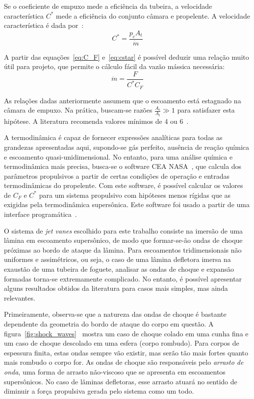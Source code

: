 Se o coeficiente de empuxo mede a eficiência da tubeira, a velocidade característica \(C^*\) mede a eficiência do conjunto câmara e propelente. A velocidade característica é dada por~\cite{Sutton}:
\begin{equation}
    \label{eq:cstar}
    C^* = \frac{p_c A_t}{\dot{m}}
\end{equation}

A partir das equações~\ref{eq:C_F} e~\ref{eq:cstar} é possível deduzir uma relação muito útil para projeto, que permite o cálculo fácil da vazão mássica necessária:
\begin{equation}
    \label{eq:mdot}
    \dot{m} = \frac{F}{C^* C_F}
\end{equation}

As relações dadas anteriormente assumem que o escoamento está estagnado na câmara de empuxo. Na prática, buscam-se razões \(\frac{A_c}{A_t} \gg 1\) para satisfazer esta hipótese. A literatura recomenda valores mínimos de 4 ou 6~\cite{Sutton}.

A termodinâmica é capaz de fornecer expressões analíticas para todas as grandezas apresentadas aqui, supondo-se gás perfeito, ausência de reação química e escoamento quasi-unidimensional. No entanto, para uma análise química e termodinâmica mais precisa, busca-se o software CEA NASA~\cite{ceanasa}, que calcula dos parâmetros propulsivos a partir de certas condições de operação e entradas termodinâmicas do propelente. Com este software, é possível calcular os valores de \(C_F\) e \(C^*\) para um sistema propulsivo com hipóteses menos rígidas que as exigidas pela termodinâmica supersônica. Este software foi usado a partir de uma interface programática~\cite{rocketcea}.

O sistema de \textit{jet vanes} escolhido para este trabalho consiste na imersão de uma lâmina em escoamento supersônico, de modo que formar-se-ão ondas de choque próximas ao bordo de ataque da lâmina. Para escoamentos tridimensionais não uniformes e assimétricos, ou seja, o caso de uma lâmina defletora imersa na exaustão de uma tubeira de foguete, analisar as ondas de choque e expansão formadas torna-se extremamente complicado. No entanto, é possível apresentar alguns resultados obtidos da literatura para casos mais simples, mas ainda relevantes. 

Primeiramente, observa-se que a natureza das ondas de choque é bastante dependente da geometria do bordo de ataque do corpo em questão. A figura~\ref{fig:shock_waves}~\cite{vandyke} mostra um caso de choque colado em uma cunha fina e um caso de choque descolado em uma esfera (corpo rombudo). Para corpos de espessura finita, estas ondas sempre vão existir, mas serão tão mais fortes quanto mais rombudo o corpo for. As ondas de choque são responsáveis pelo \textit{arrasto de onda}, uma forma de arrasto não-viscoso que se apresenta em escoamentos supersônicos. No caso de lâminas defletoras, esse arrasto atuará no sentido de diminuir a força propulsiva gerada pelo sistema como um todo.

